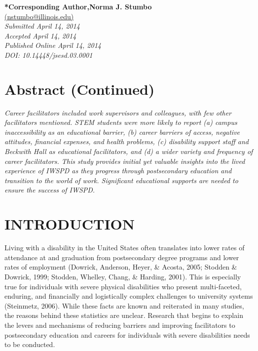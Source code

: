\documentclass[11.5pt]{sig-alternate} %
\begin{document}


\textbf{*Corresponding Author,Norma J. Stumbo}\\
\href{mailto:nstumbo@illinois.edu}{(nstumbo@illinois.edu)}\\
\textit{Submitted April 14, 2014}\\
\textit{Accepted April 14, 2014}\\
\textit{Published Online April 14, 2014}\\
\textit{DOI: 10.14448/jsesd.03.0001}\\

\pagebreak
\clearpage
\begin{large}
\section*{Abstract (Continued)}
\textit{Career facilitators included work supervisors and colleagues, with few other facilitators mentioned. STEM students were more likely to report (a) campus inaccessibility as an educational barrier, (b) career barriers of access, negative attitudes, financial expenses, and health problems, (c) disability support staff and Beckwith Hall as educational facilitators, and (d) a wider variety and frequency of career facilitators. This study provides initial yet valuable insights into the lived experience of IWSPD as they progress through postsecondary education and transition to the world of work. Significant educational supports are needed to ensure the success of IWSPD.}

\section*{INTRODUCTION}
Living with a disability in the United States often translates into lower rates of attendance at and graduation from postsecondary degree programs and lower rates of employment (Dowrick, Anderson, Heyer, \& Acosta, 2005; Stodden \& Dowrick, 1999; Stodden, Whelley, Chang, \& Harding, 2001). This is especially true for individuals with severe physical disabilities who present multi-faceted, enduring, and financially and logistically complex challenges to university systems (Steinmetz, 2006). While these facts are known and reiterated in many studies, the reasons behind these statistics are unclear. Research that begins to explain the levers and mechanisms of reducing barriers and improving facilitators to postsecondary education and careers for individuals with severe disabilities needs to be conducted. 


\end{large}
\end{document}
